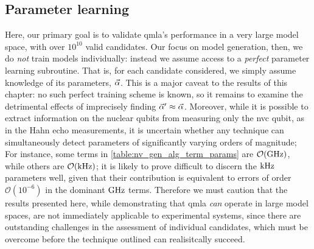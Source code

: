 \subsection{Parameter learning}
Here, our primary goal is to validate \gls{qmla}'s performance in a 
    very large \gls{model space}, with over $10^{10}$ valid candidates. 
Our focus on model generation, then, we do \emph{not} train models individually:
    instead we assume access to a \emph{perfect} parameter learning subroutine.
That is, for each candidate considered, we simply assume knowledge of its parameters, $\vec{\alpha}$. 
This is a major caveat to the results of this chapter: 
    no such perfect training scheme is known, 
    so it remains to examine the detrimental effects of imprecisely finding $\vec{\alpha}^{\prime} \approx \vec{\alpha}$. 
Moreover, while it is possible to extract information on the nuclear qubits from measuring only the 
    \gls{nvc} qubit, as in the Hahn echo measurements, 
    it is uncertain whether any technique can simultaneously detect parameters of significantly varying orders of magnitude;
For instance, some terms in \cref{table:nv_gen_alg_term_params} are $\mathcal{O}(\textrm{GHz})$, 
    while others are $\mathcal{O}(\textrm{kHz})$;
    it is likely to prove difficult to discern the $\textrm{kHz}$ parameters well, given that their contribution is equivalent 
    to errors of order $\mathcal{O}(10^{-6})$ in the dominant $\textrm{GHz}$ terms. 
Therefore we must caution that the results presented here, 
    while demonstrating that \gls{qmla} \emph{can} operate in large model spaces, 
    are not immediately applicable to experimental systems, 
    since there are outstanding challenges in the assessment of individual candidates, 
    which must be overcome before the technique outlined can realisitcally succeed. 


